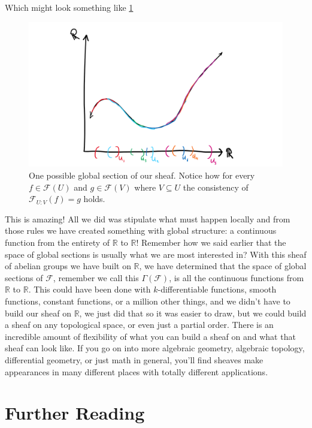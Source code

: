 \documentclass{tufte-handout}
\newcommand{\F}{\mathcal{F}}
\newcommand{\R}{\mathbb{R}}
\begin{document}
Which might look something like \cref{fig:globalsectiononR}

\begin{figure}[h!]
    \centering
    \includegraphics{globalsectiononR.png}
    \caption{One possible global section of our sheaf. Notice how for every $f \in \F(U)$ and $g \in \F(V)$ where $V \subseteq U$ the consistency of $\F_{U:V}(f) = g$ holds.}
    \label{fig:globalsectiononR}
\end{figure}
\FloatBarrier

This is amazing! All we did was stipulate what must happen locally and from those rules we have created something with global structure: a continuous function from the entirety of $\R$ to $\R$! Remember how we said earlier that the space of global sections is usually what we are most interested in? With this sheaf of abelian groups we have built on $\R$, we have determined that the space of global sections of $\F$, remember we call this $\Gamma(\F)$, is all the continuous functions from $\R$ to $\R$. This could have been done with $k$-differentiable functions, smooth functions, constant functions, or a million other things, and we didn't have to build our sheaf on $\R$, we just did that so it was easier to draw, but we could build a sheaf on any topological space, or even just a partial order. There is an incredible amount of flexibility of what you can build a sheaf on and what that sheaf can look like. If you go on into more algebraic geometry, algebraic topology, differential geometry, or just math in general, you'll find sheaves make appearances in many different places with totally different applications. 

\section{Further Reading}
\end{document}
